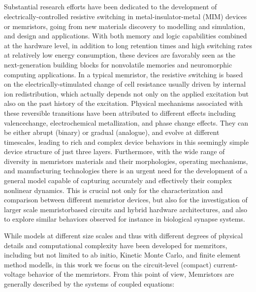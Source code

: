 \documentclass[10pt]{article}
\begin{document}
    \begin{multicols}{2}
    {\centering %
    \section{}}
        Substantial research efforts have been dedicated to the development of electrically-controlled resistive switching in metal-insulator-metal (MIM) devices or memristors, going from new materials discovery\cite{cit1, cit2, cit3, cit4, cit5, cit6, cit7} to modelling and simulation\cite{cit8, cit9, cit10}, and design and applications\cite{cit8}. With both memory and logic capabilities combined at the hardware level, in addition to long retention times and high switching rates at relatively low energy consumption\cite{cit1}, these devices are favorably seen as the next-generation building blocks for nonvolatile memories and neuromorphic computing applications. In a typical memristor, the resistive switching is based on the electrically-stimulated change of cell resistance usually driven by internal ion redistribution, which actually depends not only on the applied excitation but also on the past history of the excitation\cite{cit6}. Physical mechanisms associated with these reversible transitions have been attributed to different effects including valencechange, electrochemical metallization, and phase change effects. They can be either abrupt (binary) or gradual (analogue), and evolve at different timescales, leading to rich and complex device behaviors in this seemingly simple device structure of just three layers. Furthermore, with the wide range of diversity in memristors materials and their morphologies, operating mechanisms, and manufacturing technologies there is an urgent need for the development of a general model capable of capturing accurately and effectively their complex nonlinear dynamics. This is crucial not only for the characterization and comparison between different memristor devices, but also for the investigation of larger scale memristorbased circuits and hybrid hardware architectures, and also to explore similar behaviors observed for instance in biological synapse systems.
        \par
        While models at different size scales and thus with different degrees of physical details and computational complexity have been developed for memritors, including but not limited to ab initio, Kinetic Monte Carlo, and finite element method modells, in this work we focus on the circuit-level (compact) current-voltage behavior of the memristors. From this point of view, Memristors are generally described by the systems of coupled equations:

\end{multicols}
\end{document}
